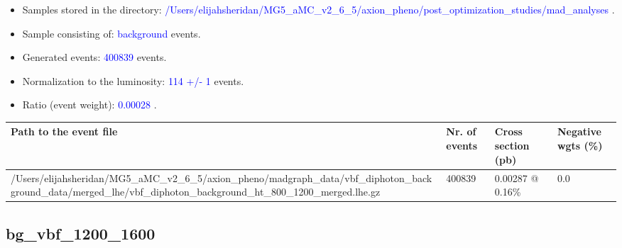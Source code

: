 \documentclass[a4paper, 10pt]{article}
\begin{document}
\begin{itemize}
  \item Samples stored in the directory: \textcolor{blue}{/\-Users/\-elijahsheridan/\-MG5\_aMC\_v2\_6\_5/\-axion\_pheno/\-post\_optimization\_studies/\-mad\_analyses} .
   \item Sample consisting of: \textcolor{blue}{background}  events.
   \item Generated events: \textcolor{blue}{400839 }  events.
   \item Normalization to the luminosity: \textcolor{blue}{114}\textcolor{blue}{ +/\-- }\textcolor{blue}{1 }  events.
   \item Ratio (event weight): \textcolor{blue}{0.00028 } .  
 
\end{itemize}
\begin{table}[H]
  \begin{center}
    \begin{tabular}{|m{55.0mm}|m{25.0mm}|m{30.0mm}|m{30.0mm}|}
      \hline
      {\cellcolor{yellow}         Path to the event file}& {\cellcolor{yellow}         Nr. of events}& {\cellcolor{yellow}         Cross section (pb)}& {\cellcolor{yellow}         Negative wgts (\%)}\\
      \hline
      {\cellcolor{white}          /\-Users/\-elijahsheridan/\-MG5\_aMC\_v2\_6\_5/\-axion\_pheno/\-madgraph\_data/\-vbf\_diphoton\_background\_data/\-merged\_lhe/\-vbf\_diphoton\_background\_ht\_800\_1200\_merged.lhe.gz}& {\cellcolor{white}          400839}& {\cellcolor{white}          0.00287 @ 0.16\%}& {\cellcolor{white}          0.0}\\
\hline
    \end{tabular}
  \end{center}
\end{table}

\subsection{ bg\_vbf\_1200\_1600}
\end{document}
